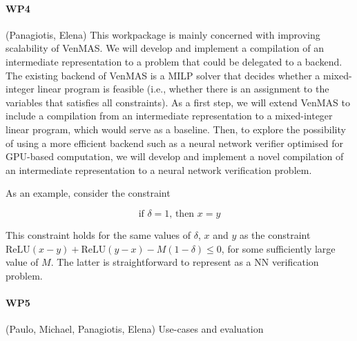 \documentclass[11pt]{article}
\begin{document}
\paragraph{WP4} (Panagiotis, Elena) This workpackage is mainly
concerned with improving scalability of VenMAS. We will develop and
implement a compilation of an intermediate representation to a problem
that could be delegated to a backend. The existing backend of VenMAS
is a MILP solver that decides whether a mixed-integer linear program
is feasible (i.e., whether there is an assignment to the variables
that satisfies all constraints). As a first step, we will extend
VenMAS to include a compilation from an intermediate representation to
a mixed-integer linear program, which would serve as a baseline.
Then, to explore the possibility of using a more efficient backend
such as a neural network verifier optimised for GPU-based computation,
we will develop and implement a novel compilation of an intermediate
representation to a neural network verification problem.

As an example, consider the constraint

\[
    \text{if }\delta = 1\text{, then }x = y
\]

This constraint holds for the same values of $\delta$, $x$ and $y$ as
the constraint
$\text{ReLU}(x-y) + \text{ReLU}(y-x) - M(1 - \delta) \leq 0$, for some
sufficiently large value of $M$. The latter is straightforward to
represent as a NN verification problem.

\paragraph{WP5} (Paulo, Michael, Panagiotis, Elena) Use-cases and evaluation 

\end{document}
